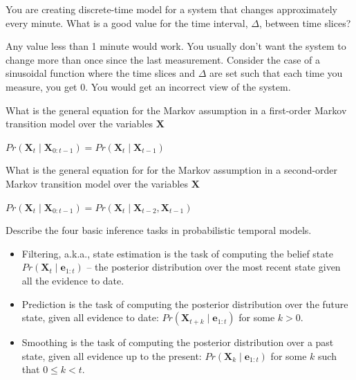\begin{questions}

\question You are creating discrete-time model for a system that changes approximately every minute.  What is a good value for the time interval, $\Delta$, between time slices?

\begin{solution}[1.25in]
Any value less than 1 minute would work.  You usually don't want the system to change more than once since the last measurement.  Consider the case of a sinusoidal function where the time slices and $\Delta$ are set such that each time you measure, you get 0.  You would get an incorrect view of the system.
\end{solution}

\question What is the general equation for the Markov assumption in a first-order Markov transition model over the variables $\bm{X}$

\begin{solution}[1in]
$Pr(\bm{X}_t \mid \bm{X}_{0:t-1}) = Pr(\bm{X}_t \mid \bm{X}_{t-1})$
\end{solution}

\question What is the general equation for for the Markov assumption in a second-order Markov transition model over the variables $\bm{X}$

\begin{solution}[1in]
$Pr(\bm{X}_t \mid \bm{X}_{0:t-1}) = Pr(\bm{X}_t \mid \bm{X}_{t-2}, \bm{X}_{t-1})$
\end{solution}

\newpage

\question Describe the four basic inference tasks in probabilistic temporal models.

\begin{solution}[4in]
\begin{itemize}
\item Filtering, a.k.a., state estimation is the task of computing the belief state $Pr(\bm{X}_t \mid \bm{e}_{1:t})$ -- the posterior distribution over the most recent state given all the evidence to date.

\item Prediction is the task of computing the posterior distribution over the future state, given all evidence to date: $Pr(\bm{X}_{t+k} \mid \bm{e}_{1:t})$ for some $k > 0$.

\item Smoothing is the task of computing the posterior distribution over a past state, given all evidence up to the present: $Pr(\bm{X}_k \mid \bm{e}_{1:t})$ for some $k$ such that $0 \le k < t$.


\end{itemize}
\end{solution}
\end{questions}
